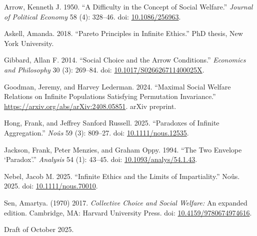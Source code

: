 \documentclass[
  11pt,
  letterpaper,
  DIV=11,
  numbers=noendperiod,
  twoside]{scrartcl}
\newlength{\cslhangindent}
\newenvironment{CSLReferences}[2] %
 {\begin{list}{}{%
  \setlength{\itemindent}{0pt}
  \setlength{\leftmargin}{0pt}
  \setlength{\parsep}{0pt}
  \ifodd #1
   \setlength{\leftmargin}{\cslhangindent}
   \setlength{\itemindent}{-1\cslhangindent}
  \fi
  \setlength{\itemsep}{#2\baselineskip}}}
 {\end{list}}
\begin{document}
\label{refs}
\begin{CSLReferences}{1}{0}
Arrow, Kenneth J. 1950. {``A Difficulty in the Concept of Social
Welfare.''} \emph{Journal of Political Economy} 58 (4): 328--46. doi:
\href{https://doi.org/10.1086/256963}{10.1086/256963}.

Askell, Amanda. 2018. {``Pareto Principles in Infinite Ethics.''} PhD
thesis, New York University.

Gibbard, Allan F. 2014. {``Social Choice and the Arrow Conditions.''}
\emph{Economics and Philosophy} 30 (3): 269--84. doi:
\href{https://doi.org/10.1017/S026626711400025X}{10.1017/S026626711400025X}.

Goodman, Jeremy, and Harvey Lederman. 2024. {``Maximal Social Welfare
Relations on Infinite Populations Satisfying Permutation Invariance.''}
\url{https://arxiv.org/abs/arXiv:2408.05851}. arXiv preprint.

Hong, Frank, and Jeffrey Sanford Russell. 2025. {``Paradoxes of Infinite
Aggregation.''} \emph{Noûs} 59 (3): 809--27. doi:
\href{https://doi.org/10.1111/nous.12535}{10.1111/nous.12535}.

Jackson, Frank, Peter Menzies, and Graham Oppy. 1994. {``The Two
Envelope {`Paradox'}.''} \emph{Analysis} 54 (1): 43--45. doi:
\href{https://doi.org/10.1093/analys/54.1.43}{10.1093/analys/54.1.43}.

Nebel, Jacob M. 2025. {``Infinite Ethics and the Limits of
Impartiality.''} No{û}s. 2025. doi:
\href{https://doi.org/10.1111/nous.70010}{10.1111/nous.70010}.

Sen, Amartya. (1970) 2017. \emph{Collective Choice and Social Welfare:}
An expanded edition. Cambridge, MA: Harvard University Press. doi:
\href{https://doi.org/10.4159/9780674974616}{10.4159/9780674974616}.

\end{CSLReferences}



\noindent Draft of October 2025.
\end{document}
